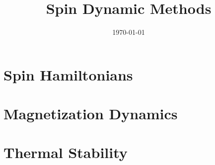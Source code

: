 \documentclass[11pt]{article}
\title{Spin Dynamic Methods}
\author{}
\date{\today}
\numberwithin{equation}{section}
\begin{document}
\maketitle
\tableofcontents





\section{Spin Hamiltonians}



\section{Magnetization Dynamics}


\section{Thermal Stability}



\end{document}
